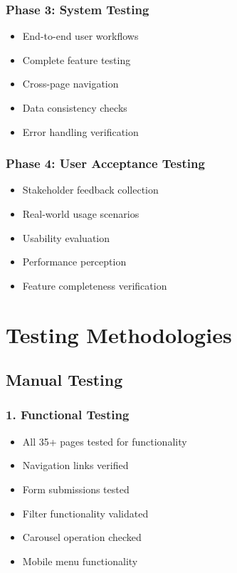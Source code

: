 \documentclass[12pt,a4paper]{report}
\begin{document}
\subsubsection*{Phase 3: System Testing}
\begin{itemize}
    \item End-to-end user workflows
    \item Complete feature testing
    \item Cross-page navigation
    \item Data consistency checks
    \item Error handling verification
\end{itemize}

\subsubsection*{Phase 4: User Acceptance Testing}
\begin{itemize}
    \item Stakeholder feedback collection
    \item Real-world usage scenarios
    \item Usability evaluation
    \item Performance perception
    \item Feature completeness verification
\end{itemize}

\section{Testing Methodologies}

\subsection{Manual Testing}

\subsubsection*{1. Functional Testing}
\begin{itemize}
    \item All 35+ pages tested for functionality
    \item Navigation links verified
    \item Form submissions tested
    \item Filter functionality validated
    \item Carousel operation checked
    \item Mobile menu functionality
\end{itemize}
\end{document}
